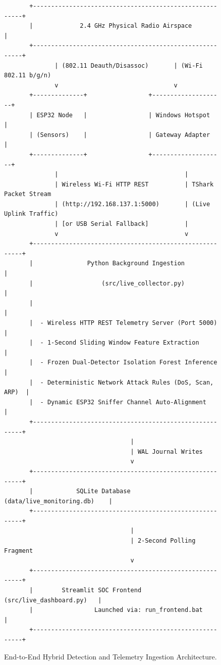 \documentclass[11pt,a4paper]{article}
\begin{document}
\begin{figure}[htbp]
\centering
\begin{verbatim}
       +--------------------------------------------------------+
       |             2.4 GHz Physical Radio Airspace            |
       +--------------------------------------------------------+
              | (802.11 Deauth/Disassoc)       | (Wi-Fi 802.11 b/g/n)
              v                                v
       +--------------+                 +--------------------+
       | ESP32 Node   |                 | Windows Hotspot    |
       | (Sensors)    |                 | Gateway Adapter    |
       +--------------+                 +--------------------+
              |                                   |
              | Wireless Wi-Fi HTTP REST          | TShark Packet Stream
              | (http://192.168.137.1:5000)       | (Live Uplink Traffic)
              | [or USB Serial Fallback]          |
              v                                   v
       +--------------------------------------------------------+
       |               Python Background Ingestion               |
       |                   (src/live_collector.py)               |
       |                                                        |
       |  - Wireless HTTP REST Telemetry Server (Port 5000)      |
       |  - 1-Second Sliding Window Feature Extraction          |
       |  - Frozen Dual-Detector Isolation Forest Inference      |
       |  - Deterministic Network Attack Rules (DoS, Scan, ARP)  |
       |  - Dynamic ESP32 Sniffer Channel Auto-Alignment         |
       +--------------------------------------------------------+
                                   |
                                   | WAL Journal Writes
                                   v
       +--------------------------------------------------------+
       |            SQLite Database (data/live_monitoring.db)    |
       +--------------------------------------------------------+
                                   |
                                   | 2-Second Polling Fragment
                                   v
       +--------------------------------------------------------+
       |        Streamlit SOC Frontend (src/live_dashboard.py)   |
       |                 Launched via: run_frontend.bat         |
       +--------------------------------------------------------+
\end{verbatim}
\caption{End-to-End Hybrid Detection and Telemetry Ingestion Architecture.}
\end{figure}
\end{document}
